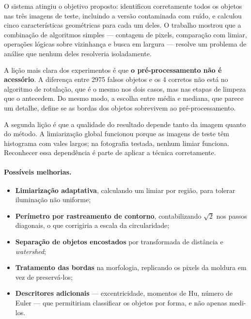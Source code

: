\documentclass[12pt,a4paper]{article}
\begin{document}
O sistema atingiu o objetivo proposto: identificou corretamente todos os
objetos nas três imagens de teste, incluindo a versão contaminada com ruído, e
calculou cinco características geométricas para cada um deles. O trabalho
mostrou que a combinação de algoritmos simples --- contagem de pixels,
comparação com limiar, operações lógicas sobre vizinhança e busca em largura
--- resolve um problema de análise que nenhum deles resolveria isoladamente.

A lição mais clara dos experimentos é que \textbf{o pré-processamento não é
acessório}. A diferença entre 2975 falsos objetos e os 4 corretos não está no
algoritmo de rotulação, que é o mesmo nos dois casos, mas nas etapas de
limpeza que o antecedem. Do mesmo modo, a escolha entre média e mediana, que
parece um detalhe, define se as bordas dos objetos sobrevivem ao
pré-processamento.

A segunda lição é que a qualidade do resultado depende tanto da imagem quanto
do método. A limiarização global funcionou porque as imagens de teste têm
histograma com vales largos; na fotografia testada, nenhum limiar funciona.
Reconhecer essa dependência é parte de aplicar a técnica corretamente.

\paragraph{Possíveis melhorias.}

\begin{itemize}
  \item \textbf{Limiarização adaptativa}, calculando um limiar por região,
        para tolerar iluminação não uniforme;
  \item \textbf{Perímetro por rastreamento de contorno}, contabilizando
        $\sqrt{2}$ nos passos diagonais, o que corrigiria a escala da
        circularidade;
  \item \textbf{Separação de objetos encostados} por transformada de
        distância e \emph{watershed};
  \item \textbf{Tratamento das bordas} na morfologia, replicando os pixels da
        moldura em vez de preservá-los;
  \item \textbf{Descritores adicionais} --- excentricidade, momentos de Hu,
        número de Euler --- que permitiriam classificar os objetos por forma,
        e não apenas medi-los.
\end{itemize}

\end{document}
